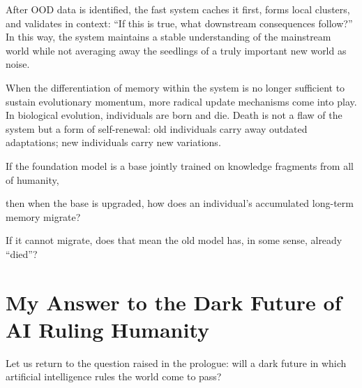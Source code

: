 \vspace{1em}

After OOD data is identified, the fast system caches it first, forms local clusters, and validates in context: ``If this is true, what downstream consequences follow?'' In this way, the system maintains a stable understanding of the mainstream world while not averaging away the seedlings of a truly important new world as noise.


When the differentiation of memory within the system is no longer sufficient to sustain evolutionary momentum, more radical update mechanisms come into play. In biological evolution, individuals are born and die. Death is not a flaw of the system but a form of self-renewal: old individuals carry away outdated adaptations; new individuals carry new variations.

\begin{thinkbox}[思考]
If the foundation model is a base jointly trained on knowledge fragments from all of humanity,

then when the base is upgraded, how does an individual's accumulated long-term memory migrate?

If it cannot migrate, does that mean the old model has, in some sense, already ``died''?
\end{thinkbox}


\newpage
\section{My Answer to the Dark Future of AI Ruling Humanity}

Let us return to the question raised in the prologue: will a dark future in which artificial intelligence rules the world come to pass?








